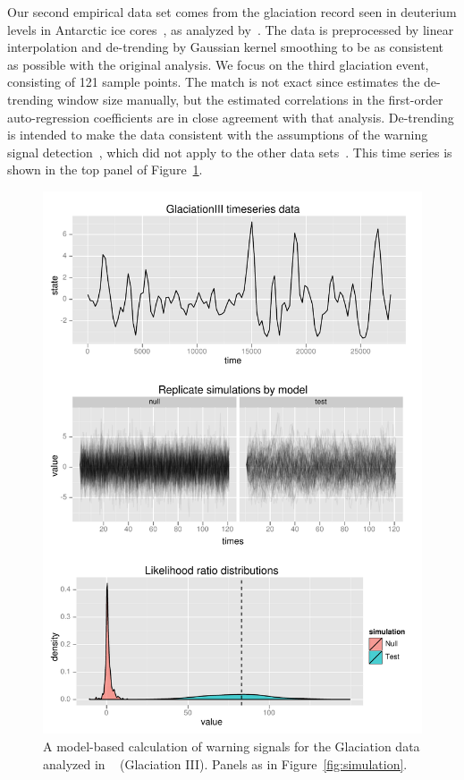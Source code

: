 \documentclass[authoryear,review,11pt]{elsarticle}
\begin{document}
Our second empirical data set comes from the glaciation record seen
in deuterium levels in Antarctic ice cores~\citep{Petit1999},
as analyzed by~\citet{Dakos2008}.
The data is preprocessed by linear interpolation and de-trending by Gaussian kernel smoothing
to be as consistent as possible with the original analysis.
We focus on the third glaciation event, consisting of 121 sample points.
The match is not exact since estimates the de-trending window size manually,
but the estimated correlations in the first-order auto-regression coefficients are in close agreement with that analysis.
De-trending is intended to make the data consistent with the assumptions of the warning signal detection~\citep{Dakos2008},
which did not apply to the other data sets~\citep{Drake2010}.
This time series is shown in the top panel of Figure~\ref{fig:glaciation}.
 \begin{figure}
   \begin{center}
     \includegraphics[width=.85\linewidth]{figures/GlaciationIII_warningsignal.pdf}
     \caption{A model-based calculation of warning signals for the Glaciation data analyzed in ~\citet{Dakos2008} (Glaciation III).  Panels as in Figure~\ref{fig:simulation}.}
     \label{fig:glaciation}
  \end{center}
 \end{figure}
\end{document}
